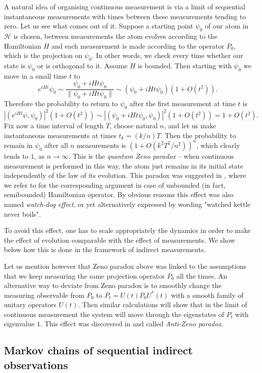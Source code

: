 \documentclass[10pt,a4paper]{amsart}
\def\HC{\mathcal{H}}
\begin{document}
A natural idea of organising continuous measurement is via a limit of sequential instantaneous
measurements with times between these measurements tending to zero. Let us see what comes out of it.
Suppose a starting point $\psi_0$ of our atom in $\HC$ is chosen, between measurements
 the atom evolves according to the Hamiltonian $H$ and each measurement is made according
 to the operator $P_0$, which is the projection on $\psi_0$. In other words,
 we check every time whether our state is $\psi_0$ or is orthogonal to it.
 Assume $H$ is bounded. Then starting with $\psi_0$ we move in a small time $t$ to
 \[
 e^{iHt}\psi_0\sim \frac{\psi_0+iHt \psi_0}{\|\psi_0+iHt \psi_0\|}\sim (\psi_0+iHt \psi_0)(1+O(t^2)).
 \]
 Therefore the probability to return to $\psi_0$ after the first measurement at time $t$ is
 \[
 |(e^{iHt}\psi,\psi_0)|^2(1+O(t^2))\sim |(\psi_0+iHt \psi_0,\psi_0)|^2(1+O(t^2))=1+O(t^2).
 \]
 Fix now a time interval of length $T$, choose natural $n$,  and let us make instantaneous
 measurements at times $t_k=(k/n)T$. Then the probability to remain in $\psi_0$ after all $n$
 measurements is $(1+O(k^2T^2/n^2))^n$, which clearly tends to $1$, as $n\to \infty$.
 This is the {\it quantum Zeno paradox} -- when continuous measurement is performed in this way,
 the atom just remains in its initial state independently of the law of its evolution.
 This paradox was suggested in \cite{Zeno}, where we refer to for the corresponding
  argument in case of unbounded (in fact, semibounded) Hamiltonian operator.
 By obvious reasons this effect was also named {\it watch-dog effect}, or yet alternatively
 expressed by  wording "watched kettle never boils".

 To avoid this effect, one has to scale appropriately the dynamics in order to
 make the effect of evolution comparable with the effect of measurements.
 We show below how this is done in the framework of indirect measurements.

 Let us mention however that Zeno paradox above was linked to the assumptions that
 we keep measuring the same projection operator $P_0$ all the times. An alternative way to deviate
 from Zeno paradox is to smoothly change the measuring observable from $P_0$ to $P_t=U(t)P_0U^*(t)$
 with a smooth family of unitary operators $U(t)$. Then similar calculations will show that
 in the limit of continuous measurement the system will move through the eigenstates of $P_t$
 with eigenvalue $1$. This effect was discovered in \cite{Anti-Zeno} and called
 {\it Anti-Zeno paradox}.

\subsection{Markov chains of sequential indirect observations}
\label{secMarchainindirodserv}
\end{document}

